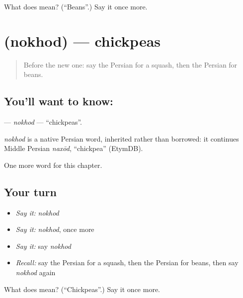 \begin{tcolorbox}[breakable,colback=teal!4,colframe=teal!35!black,title={Before you move on}]
What does  mean? (\textquotedblleft{}Beans\textquotedblright{}.) Say it once more.
\end{tcolorbox}
\section[\texorpdfstring{\fa{نخود} (nokhod)}{نخود (nokhod)}]{ (nokhod) — chickpeas}

\label{lesson:FA-C119-nokhod}



\begin{quote}
Before the new one: say the Persian for a squash, then the Persian for beans.
\end{quote}

\subsection*{You'll want to know: }
\textbf{} — \emph{nokhod} — \textquotedblleft{}chickpeas\textquotedblright{}.

\begin{cousinweb}
\emph{nokhod} is a native Persian word, inherited rather than borrowed: it continues Middle Persian \emph{naxōd}, \textquotedblleft{}chickpea\textquotedblright{} (EtymDB).
\end{cousinweb}

\begin{grammarlens}[title={What you've built}]
One more word for this chapter.
\end{grammarlens}

\subsection*{Your turn}
\begin{itemize}
\raggedright
  \item \emph{Say it:} \emph{nokhod}
  \item \emph{Say it:} \emph{nokhod}, once more
  \item \emph{Say it:} say \emph{nokhod}
  \item \emph{Recall:} say the Persian for a squash, then the Persian for beans, then say \emph{nokhod} again
\end{itemize}

\begin{tcolorbox}[breakable,colback=teal!4,colframe=teal!35!black,title={Before you move on}]
What does  mean? (\textquotedblleft{}Chickpeas\textquotedblright{}.) Say it once more.
\end{tcolorbox}
